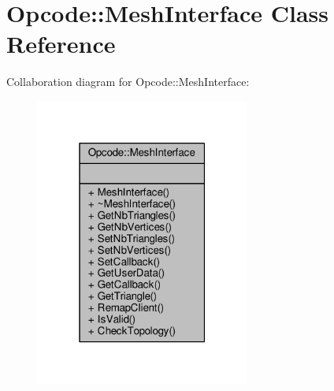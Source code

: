 \hypertarget{classOpcode_1_1MeshInterface}{}\section{Opcode\+:\+:Mesh\+Interface Class Reference}
\label{classOpcode_1_1MeshInterface}


Collaboration diagram for Opcode\+:\+:Mesh\+Interface\+:
\nopagebreak
\begin{figure}[H]
\begin{center}
\leavevmode
\includegraphics[width=199pt]{d3/d84/classOpcode_1_1MeshInterface__coll__graph}
\end{center}
\end{figure}
